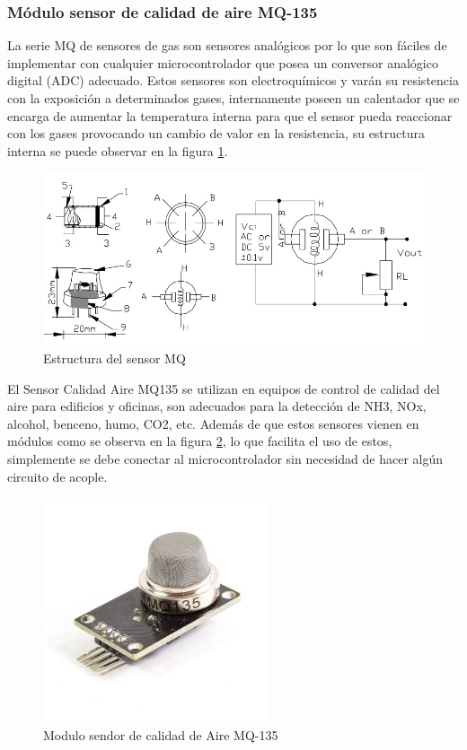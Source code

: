 \subsubsection{Módulo sensor de calidad de aire MQ-135}

La serie MQ de sensores de gas son sensores analógicos por lo que son fáciles de implementar con cualquier microcontrolador que posea un conversor analógico digital (ADC) adecuado. Estos sensores son electroquímicos y varán su resistencia con la exposición a determinados gases, internamente poseen un calentador que se encarga de aumentar la temperatura interna para que el sensor pueda reaccionar con los gases provocando un cambio de valor en la resistencia, su estructura interna se puede observar en la figura \ref{fig:estructura-del-sensor-mq}.\cite{MQ1}

\begin{figure}[H]
	\centering
	\caption{Estructura del sensor MQ \cite{MQ1}}
	\label{fig:estructura-del-sensor-mq}
	\includegraphics[width=0.7\linewidth]{Imagenes/Estructura_del_sensor_MQ}
\end{figure}

El Sensor Calidad Aire MQ135 se utilizan en equipos de control de calidad del aire para edificios y oficinas, son adecuados para la detección de NH3, NOx, alcohol, benceno, humo, CO2, etc. Además de que estos sensores vienen en módulos como se observa en la figura \ref{fig:sensor-calidad-aire-mq135}, lo que facilita el uso de estos, simplemente se debe conectar al microcontrolador sin necesidad de hacer algún circuito de acople. \cite{MQ1}

\begin{figure}[H]
	\centering
	\caption{Modulo sendor de calidad de Aire MQ-135 \cite{MQ1}}
	\label{fig:sensor-calidad-aire-mq135}
	\includegraphics[width=0.35\linewidth]{Imagenes/sensor-calidad-aire-mq135}
\end{figure}

